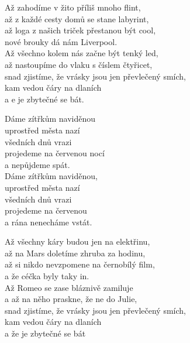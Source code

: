 
\ve
{}Až zahodíme v žito příliš mnoho flint,\\
až z každé cesty domů se stane labyrint,\\
až loga z našich triček přestanou být cool,\\
nové brouky dá nám Liverpool.\\
Až všechno kolem nás začne být tenký led,\\
až nastoupíme do vlaku s číslem čtyřicet,\\
snad zjistíme, že vrásky jsou jen převlečený smích,\\
kam vedou čáry na dlaních\\
a e je zbytečné se bát.

\cho{}
Dáme zítřkům naviděnou\\
uprostřed města nazí\\
všedních dnů vrazi\\
projedeme na červenou nocí\\
a nepůjdeme spát.\\
Dáme zítřkům naviděnou,\\
uprostřed města nazí\\
všedních dnů vrazi\\
projedeme na červenou\\
a rána nenecháme vstát.

\ve
Až všechny káry budou jen na elektřinu,\\
až na Mars doletíme zhruba za hodinu,\\
až si nikdo nevzpomene na černobílý film,\\
a že céčka byly taky in.\\
Až Romeo se zase bláznivě zamiluje\\
a až na něho praskne, že ne do Julie,\\
snad zjistíme, že vrásky jsou jen převlečený smích,\\
kam vedou čáry na dlaních\\
a že je zbytečné se bát

\cho

\esong